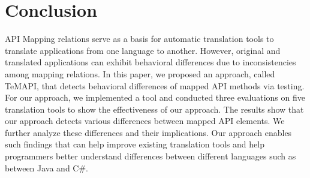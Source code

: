 \section{Conclusion}
\label{sec:conclusion}

API Mapping relations serve as a basis for automatic translation tools to translate applications from one language to another. However, original and translated applications can exhibit behavioral differences due to inconsistencies among mapping relations. In this paper, we proposed an approach, called TeMAPI, that detects behavioral differences of mapped API methods via testing. For our approach, we implemented a tool and conducted three evaluations on five translation tools to show the effectiveness of our approach. The results show that our approach detects various differences between mapped API elements. We further analyze these differences and their implications. Our approach enables such findings that can help improve existing translation tools and help programmers better understand differences between different languages such as between Java and C\#.

